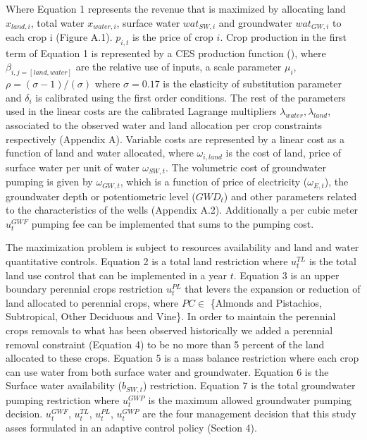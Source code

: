 \documentclass[11pt,a4paper]{article}
\begin{document}
Where Equation 1 represents the revenue that is maximized by allocating land $x_{land,i}$, total water $x_{water,i}$, surface water $wat_{SW,i}$ and groundwater $wat_{GW,i}$ to each crop i (Figure A.1). $p_{i,t}$ is the price of crop $i$. Crop production in the first term of Equation 1 is represented by a CES production function (\cite{debertin_agricultural_2012}), where $\beta_{i,j=[land,water]}$ are the relative use of inputs, a scale parameter $\mu_{i}$, $\rho = (\sigma-1)/(\sigma)$ where $\sigma = 0.17$ is the elasticity of substitution parameter and $\delta_{i}$ is calibrated using the first order conditions. The rest of the parameters used in the linear costs are the calibrated Lagrange multipliers $\lambda_{water},\lambda_{land}$, associated to the observed water and land allocation per crop constraints respectively (Appendix A). Variable costs are represented by a linear cost as a function of land and water allocated, where $\omega_{i,land}$ is the cost of land, price of surface water per unit of water $\omega_{SW,t}$. The volumetric cost of groundwater pumping is given by $\omega_{GW,t}$, which is a function of price of electricity ($\omega_{E,t}$), the groundwater depth or potentiometric level ($GWD_t$) and other parameters related to the characteristics of the wells (Appendix A.2). Additionally a per cubic meter $u^{GWF}_{t}$ pumping fee can be implemented that sums to the pumping cost.

The maximization problem is subject to resources availability and land and water quantitative controls. Equation 2 is a total land restriction where $u^{TL}_{t}$ is the total land use control that can be implemented in a year $t$. Equation 3 is an upper boundary perennial crops restriction $u^{PL}_{t}$ that levers the expansion or reduction of land allocated to perennial crops, where $PC \in$ \{Almonds and Pistachios, Subtropical, Other Deciduous and Vine\}. In order to maintain the perennial crops removals to what has been observed historically we added a perennial removal constraint (Equation 4) to be no more than 5 percent of the land allocated to these crops. Equation 5 is a mass balance restriction where each crop can use water from both surface water and groundwater. Equation 6 is the Surface water availability ($b_{SW,t}$) restriction. Equation 7 is the total groundwater pumping restriction where $u^{GWP}_{t}$ is the maximum allowed groundwater pumping decision. $u^{GWF}_{t}$, $u^{TL}_{t}$, $u^{PL}_{t}$, $u^{GWP}_{t}$ are the four management decision that this study asses formulated in an adaptive control policy (Section  4).
\end{document}
